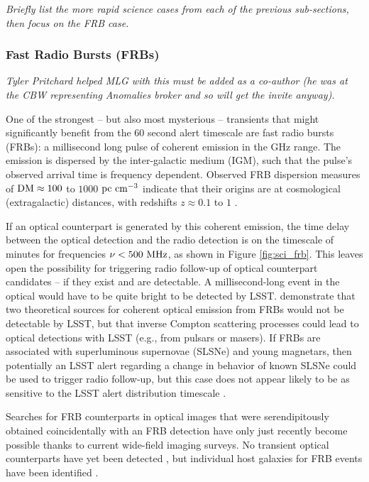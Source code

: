 {\it Briefly list the more rapid science cases from each of the previous sub-sections, then focus on the FRB case.}

\subsubsection{Fast Radio Bursts (FRBs)}
{\it Tyler Pritchard helped MLG with this must be added as a co-author (he was at the CBW representing Anomalies broker and so will get the invite anyway).}

One of the strongest -- but also most mysterious -- transients that might significantly benefit from the $60$ second alert timescale are fast radio bursts (FRBs): a millisecond long pulse of coherent emission in the GHz range. The emission is dispersed by the inter-galactic medium (IGM), such that the pulse's observed arrival time is frequency dependent. Observed FRB dispersion measures of $\rm{DM}\approx100$ to $1000$ $\rm pc\ cm^{-3}$ indicate that their origins are at cosmological (extragalactic) distances, with redshifts $z\approx0.1$ to $1$ \citep{2018Natur.562..386S}. 

If an optical counterpart is generated by this coherent emission, the time delay between the optical detection and the radio detection is on the timescale of minutes for frequencies $\nu < 500\ {\rm MHz}$, as shown in Figure \ref{fig:sci_frb}. This leaves open the possibility for triggering radio follow-up of optical counterpart candidates -- if they exist and are detectable. A millisecond-long event in the optical would have to be quite bright to be detected by LSST. \cite{2019ApJ...878...89Y} demonstrate that two theoretical sources for coherent optical emission from FRBs would not be detectable by LSST, but that inverse Compton scattering processes could lead to optical detections with LSST (e.g., from pulsars or masers). If FRBs are associated with superluminous supernovae (SLSNe) and young magnetars, then potentially an LSST alert regarding a change in behavior of known SLSNe could be used to trigger radio follow-up, but this case does not appear likely to be as sensitive to the LSST alert distribution timescale \citep{2019arXiv191002036L}.

Searches for FRB counterparts in optical images that were serendipitously obtained coincidentally with an FRB detection have only just recently become possible thanks to current wide-field imaging surveys. No transient optical counterparts have yet been detected \citep{2019ApJ...881...30T}, but individual host galaxies for FRB events have been identified \citep{2016Natur.530..453K}. 

